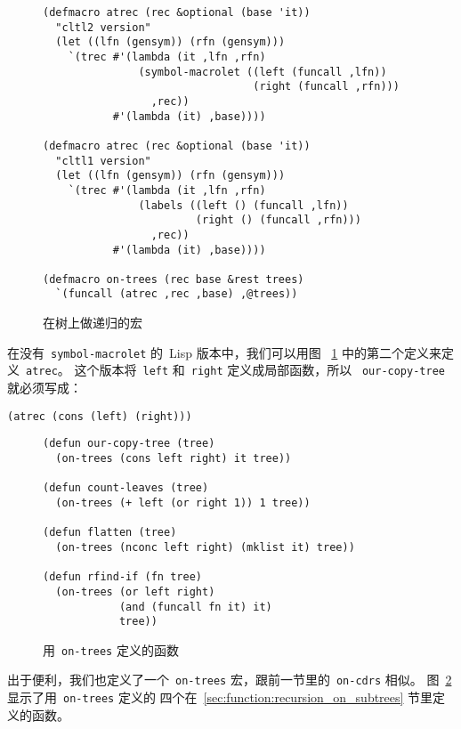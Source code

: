 \begin{figure}
\begin{lstlisting}
(defmacro atrec (rec &optional (base 'it))
  "cltl2 version"
  (let ((lfn (gensym)) (rfn (gensym)))
    `(trec #'(lambda (it ,lfn ,rfn)
               (symbol-macrolet ((left (funcall ,lfn))
                                 (right (funcall ,rfn)))
                 ,rec))
           #'(lambda (it) ,base))))

(defmacro atrec (rec &optional (base 'it))
  "cltl1 version"
  (let ((lfn (gensym)) (rfn (gensym)))
    `(trec #'(lambda (it ,lfn ,rfn)
               (labels ((left () (funcall ,lfn))
                        (right () (funcall ,rfn)))
                 ,rec))
           #'(lambda (it) ,base))))

(defmacro on-trees (rec base &rest trees)
  `(funcall (atrec ,rec ,base) ,@trees))
\end{lstlisting}
  \caption{在树上做递归的宏}
  \label{fig:macros_for_recursion_on_trees}
\end{figure}

在没有~\texttt{symbol-macrolet} 的~Lisp 版本中，我们可以用图
~\ref{fig:macros_for_recursion_on_trees} 中的第二个定义来定义~\texttt{atrec}。
这个版本将~\texttt{left} 和~\texttt{right} 定义成局部函数，所以
~\texttt{our-copy-tree} 就必须写成：
\begin{lstlisting}
(atrec (cons (left) (right)))
\end{lstlisting}

\begin{figure}
\begin{lstlisting}
(defun our-copy-tree (tree)
  (on-trees (cons left right) it tree))

(defun count-leaves (tree)
  (on-trees (+ left (or right 1)) 1 tree))

(defun flatten (tree)
  (on-trees (nconc left right) (mklist it) tree))

(defun rfind-if (fn tree)
  (on-trees (or left right)
            (and (funcall fn it) it)
            tree))
\end{lstlisting}
  \caption{用~\texttt{on-trees} 定义的函数}
  \label{fig:functions_defined_using_on-trees}
\end{figure}

出于便利，我们也定义了一个~\texttt{on-trees} 宏，跟前一节里的~\texttt{on-cdrs} 相似。
图~\ref{fig:functions_defined_using_on-trees} 显示了用~\texttt{on-trees} 定义的
四个在~\ref{sec:function:recursion_on_subtrees} 节里定义的函数。

